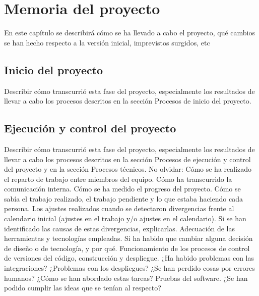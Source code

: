 \section{Memoria del proyecto}
\label{memoria}
En este capítulo se describirá cómo se ha llevado a cabo el proyecto, qué cambios se han hecho respecto a la versión inicial, imprevistos surgidos, etc
\subsection{Inicio del proyecto}
\label{Inicio del proyecto}
Describir cómo transcurrió esta fase del proyecto, especialmente los resultados de llevar a cabo los procesos descritos en la sección Procesos de inicio del proyecto.
\subsection{Ejecución y control del proyecto}
\label{Ejecucion y control del proyecto}
Describir cómo transcurrió esta fase del proyecto, especialmente los resultados de llevar a cabo los procesos descritos en la sección Procesos de ejecución y control del proyecto y en la sección Procesos técnicos. No olvidar:
Cómo se ha realizado el reparto de trabajo entre miembros del equipo. Cómo ha transcurrido la comunicación interna. 
Cómo se ha medido el progreso del proyecto. Cómo se sabía el trabajo realizado, el trabajo pendiente y lo que estaba haciendo cada persona.
Los ajustes realizados cuando se detectaron divergencias frente al calendario inicial (ajustes en el trabajo y/o ajustes en el calendario). Si se han identificado las causas de estas divergencias, explicarlas.
Adecuación de las herramientas y tecnologías empleadas. Si ha habido que cambiar alguna decisión de diseño o de tecnología, y por qué.
Funcionamiento de los procesos de control de versiones del código, construcción y despliegue. ¿Ha habido problemas con las integraciones? ¿Problemas con los despliegues? ¿Se han perdido cosas por errores humanos? ¿Cómo se han abordado estas tareas?
Pruebas del software. ¿Se han podido cumplir las ideas que se tenían al respecto?

